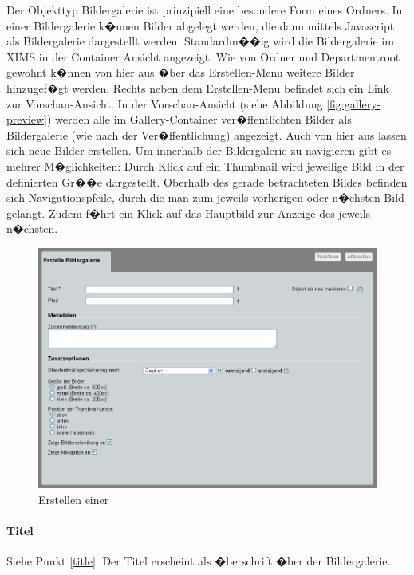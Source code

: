 Der Objekttyp Bildergalerie ist prinzipiell eine besondere Form eines Ordners. In einer Bildergalerie
k�nnen Bilder abgelegt werden, die dann mittels Javascript als Bildergalerie dargestellt werden.
Standardm��ig wird die Bildergalerie im XIMS in der Container Ansicht angezeigt. Wie von Ordner und 
Departmentroot gewohnt k�nnen von hier aus �ber das Erstellen-Menu weitere Bilder hinzugef�gt werden. 
Rechts neben dem Erstellen-Menu befindet sich ein Link zur Vorschau-Ansicht.
In der Vorschau-Ansicht (siehe Abbildung \ref{fig:gallery-preview}) werden alle im Gallery-Container 
ver�ffentlichten Bilder als Bildergalerie (wie nach der Ver�ffentlichung) angezeigt. Auch von hier aus 
lassen sich neue Bilder erstellen.
Um innerhalb der Bildergalerie zu navigieren gibt es mehrer M�glichkeiten: Durch Klick auf ein Thumbnail 
wird jeweilige Bild in der definierten Gr��e dargestellt. Oberhalb des gerade betrachteten Bildes 
befinden sich Navigationspfeile, durch die man zum jeweils vorherigen oder n�chsten Bild gelangt. Zudem f�hrt
ein Klick auf das Hauptbild zur Anzeige des jeweils n�chsten.
\begin{figure}[!ht]
  \centering
  \includegraphics[width=\textwidth]{./images/create-gallery.png}
  \caption{Erstellen einer }
  \label{fig:create-gallery}
\end{figure}


\paragraph{Titel}
Siehe Punkt \ref{title}. Der Titel erscheint als �berschrift �ber der Bildergalerie.

